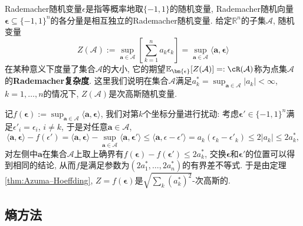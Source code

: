\begin{example}[点集的Rademacher复杂度]\label{ex:RCofPtSet}
	Rademacher随机变量$\epsilon$是指等概率地取$\{-1, 1\}$的随机变量, 
	Rademacher随机向量$\bm{\epsilon} \subseteq \{-1,1\}^n$的各分量是相互独立的Rademacher随机变量. 
	给定$\mathbb{R}^n$的子集$\mathcal{A}$, 随机变量
	\begin{equation*}
		Z(\mathcal{A})
		:= \sup_{\bm{a} \in \mathcal{A}} \left[ \sum_{k=1}^n a_k \epsilon_k \right]
		= \sup_{\bm{a} \in \mathcal{A}} \langle \bm{a}, \bm{\epsilon} \rangle
	\end{equation*}
	在某种意义下度量了集合$\mathcal{A}$的大小, 它的期望$\mathbb{E}_{\bm{\epsilon}}[Z(\mathcal{A})] =: \cR(\mathcal{A})$称为点集$\mathcal{A}$的\textbf{Rademacher复杂度}. 
	这里我们说明在集合$\mathcal{A}$满足$a_k^* = \sup_{\bm{a} \in \mathcal{A}} |a_k| < \infty$, $k = 1, \dots, n$的情况下, $Z(\mathcal{A})$是次高斯随机变量. 
	
	记$f(\bm{\epsilon}) := \sup_{\bm{a} \in \mathcal{A}} \langle \bm{a}, \bm{\epsilon} \rangle$, 我们对第$k$个坐标分量进行扰动: 
	考虑$\bm{\epsilon}' \in \{-1, 1\}^n$满足$\epsilon'_i = \epsilon_i$, $i \neq k$, 于是对任意$\bm{a} \in \mathcal{A}$, 
	\begin{equation*}
		\langle \bm{a}, \bm{\epsilon} \rangle - f(\epsilon')
		= \langle \bm{a}, \bm{\epsilon} \rangle - \sup_{\bm{a} \in \mathcal{A}} \langle \bm{a}, \bm{\epsilon}' \rangle
		\leq \langle \bm{a}, \epsilon - \epsilon' \rangle
		= a_k (\epsilon_k - \epsilon'_k)
		\leq 2 |a_k|
		\leq 2 a_k^*, 
	\end{equation*}
	对左侧中$\bm{a}$在集合$\mathcal{A}$上取上确界有$f(\bm{\epsilon}) - f(\bm{\epsilon}') \leq 2 a_k^*$, 交换$\bm{\epsilon}$和$\bm{\epsilon}'$的位置可以得到相同的结论, 从而$f$是满足参数为$(2a_1^*, \dots, 2a_n^*)$的有界差不等式. 
	于是由定理\ref{thm:Azuma–Hoeffding}, $Z = f(\bm{\epsilon})$是$\sqrt{\sum_k (a_k^*)^2}$-次高斯的. 
\end{example}


\subsection{熵方法}

